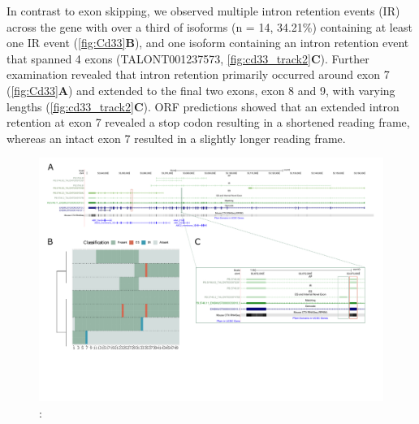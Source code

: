 In contrast to exon skipping, we observed multiple intron retention events (IR) across the gene with over a third of isoforms (n = 14, 34.21\%) containing at least one IR event (\cref{fig:Cd33}\textbf{B}), and one isoform containing an intron retention event that spanned 4 exons (TALONT001237573, \cref{fig:cd33_track2}\textbf{C}). Further examination revealed that intron retention primarily occurred around exon 7 (\cref{fig:Cd33}\textbf{A}) and extended to the final two exons, exon 8 and 9, with varying lengths (\cref{fig:cd33_track2}\textbf{C}). ORF predictions showed that an extended intron retention at exon 7 revealed a stop codon resulting in a shortened reading frame, whereas an intact exon 7 resulted in a slightly longer reading frame.

\begin{landscape}
	\begin{figure}[htp]
		\begin{center}
			\includegraphics[page=4,trim={0 1cm 0 0},scale = 0.85]{Figures/TargetGenes_Annotation_Landscape.pdf}
		\end{center}
		\captionsetup{width=0.95\textwidth}
		\caption[RNA-Seq defined transcriptome]%
		{\textbf{}: }   
		\label{fig:cd33}
	\end{figure}
\end{landscape}    

